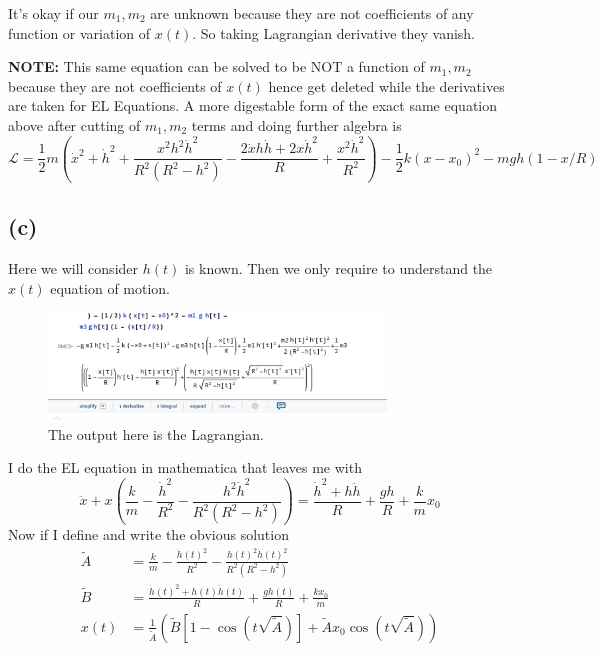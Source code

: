 \documentclass[letter, 10pts]{article}
\begin{document}

It's okay if our $m_1, m_2$ are unknown because they are not coefficients of any function or variation of $x(t)$. So taking Lagrangian derivative they vanish. 

\textbf{NOTE:} 
This same equation can be solved to be NOT a function of $m_1, m_2$ because they are not coefficients of $x(t)$ hence get deleted while the derivatives are taken for EL Equations. A more digestable form of the exact same equation above after cutting of $m_1,m_2$ terms and doing further algebra is 
\[
\mathcal L 
=
\frac{1}{2} m 
\left(
\dot x ^2  
+ 
\dot h ^2 
+ 
\frac{x^2 h^2 \dot h ^2}{R^2 (R^2 - h^2) } 
- 
\frac{2 \dot x h \dot h + 2 x \dot h ^2}{R}
+ 
\frac{x^2 \dot h ^2}{R^2}	
\right) 
- 
\frac{1}{2}k (x - x_0)^2 - mgh (1 - x / R)
\] 

\subsection*{(c)}
Here we will consider $h(t)$ is known. Then we only require to understand the $x(t)$ equation of motion.
\begin{figure}[H]
	\centering
	\includegraphics[width=0.8\textwidth]{ss/7/1.png}
	\caption{The output here is the Lagrangian. }
	\label{fig:ss-7-1-png}
\end{figure}

I do the EL equation in mathematica that leaves me with 
\[
\ddot{x} + x
\left(
\frac{k}{m} 
- 
\frac{\dot h ^2}{R^2} - 
\frac{h^2 \dot h ^2}{R^2 (R^2 - h^2)}
\right) =
\frac{\dot h ^2 + h \ddot{h} }{R} + \frac{gh}{R} + \frac{k}{m} x_0
\] 
Now if I define and write the obvious solution
\begin{align*}
	\tilde{A} &= \frac{k}{m} - \frac{\dot h(t) ^2}{R^2} - \frac{h(t)^2 \dot{h}(t)^2}{R^2 ( R^2 - h^2)} \\  
	\tilde{B} &= \frac{\dot h(t)^2 + h(t) \ddot{h}(t ) }{R} + \frac{g h(t) }{R} + \frac{kx_0}{m} \\
x(t) &= 
\frac{1}{\tilde{A}} 
\left(
\tilde B 
\left[ 
1 - \cos \left(t\sqrt{ \tilde A} \right)
\right]
+ 
\tilde A x_0
 \cos \left(t\sqrt{ \tilde A} \right)
\right)
\\
\end{align*}
\end{document}
